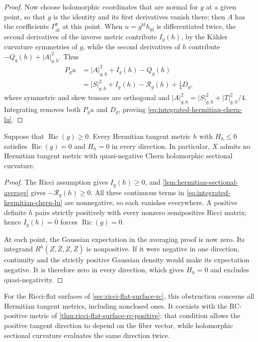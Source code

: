 \begin{proof}
Now choose holomorphic coordinates that are normal for $g$ at a given point, so that $g$ is the identity and its first derivatives vanish there; then $A$ has the coefficients $\Gamma^p_{ik}$ at this point. When $u=g^{k\bar l}h_{k\bar l}$ is differentiated twice, the second derivatives of the inverse metric contribute $I_g(h)$, by the K\"ahler curvature symmetries of $g$, while the second derivatives of $h$ contribute $-Q_g(h)+|A|_{g,h}^2$. Thus
\begin{align*}
 P_g u&=|A|_{g,h}^2+I_g(h)-Q_g(h)\\
      &=|S|_{g,h}^2+I_g(h)-\mathcal R_g(h)+\tfrac14D_g,
\end{align*}
where symmetric and skew tensors are orthogonal and
$|A|_{g,h}^2=|S|_{g,h}^2+|T|_{g,h}^2/4$. Integrating removes both $P_g u$ and $D_g$, proving \eqref{eq:integrated-hermitian-chern-lu}.
\end{proof}

\begin{corollary}\label{cor:nonnegative-ricci-sectional-obstruction}
Suppose that $\operatorname{Ric}(g)\geq0$. Every Hermitian tangent metric $h$ with $H_h\leq0$ satisfies $\operatorname{Ric}(g)=0$ and $H_h=0$ in every direction. In particular, $X$ admits no Hermitian tangent metric with quasi-negative Chern holomorphic sectional curvature.
\end{corollary}
\begin{proof}
The Ricci assumption gives $I_g(h)\geq0$, and \cref{lem:hermitian-sectional-average} gives $-\mathcal R_g(h)\geq0$. All three continuous terms in \eqref{eq:integrated-hermitian-chern-lu} are nonnegative, so each vanishes everywhere. A positive definite $h$ pairs strictly positively with every nonzero semipositive Ricci matrix; hence $I_g(h)=0$ forces $\operatorname{Ric}(g)=0$.

At each point, the Gaussian expectation in the averaging proof is now zero. Its integrand $R^h(Z,\bar Z,Z,\bar Z)$ is nonpositive. If it were negative in one direction, continuity and the strictly positive Gaussian density would make its expectation negative. It is therefore zero in every direction, which gives $H_h=0$ and excludes quasi-negativity.
\end{proof}

For the Ricci-flat surfaces of \cref{sec:ricci-flat-surface-rc}, this obstruction concerns all Hermitian tangent metrics, including nonclosed ones. It coexists with the RC-positive metric of \cref{thm:ricci-flat-surface-rc-positive}: that condition allows the positive tangent direction to depend on the fiber vector, while holomorphic sectional curvature evaluates the same direction twice.


